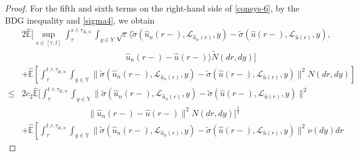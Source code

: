 \documentclass[11pt]{article}
\numberwithin{equation}{section}
\theoremstyle{plain}
\begin{document}
\begin{proof}
  For the fifth and sixth terms on the right-hand side of \eqref{consys-6},
  by the
  BDG inequality and \eqref{sigma4},
  we obtain
  \begin{align}\label{consys-10}
         & 2 \widehat{\mathbb{E}}
                 \bigg[ \sup_{s \in [\tau,t]}
                           \int_{\tau}^{s \wedge \tau_{K,n}} 
                               \int_{ {y \in Y} }
                                   \sqrt{\varepsilon}  
                                        \big\langle   
                                            \widetilde{\sigma}(\hat{u}_n(r-), \mathcal{L}_{\hat{u}_n(r)},y)
                                             - \widetilde{\sigma}(\hat{u}(r-), \mathcal{L}_{\hat{u}(r)},y),
                                                   \nonumber\\
          & \qquad\qquad\qquad\qquad\qquad\qquad\
                                              \hat{u}_n(r-) - \hat{u}(r-)
                                           \big\rangle \widetilde{N}(dr,dy)
                 \bigg]  \nonumber\\
          & + \widehat{\mathbb{E}}
                 \left[ \int_{\tau}^{t \wedge \tau_{K,n}} 
                              \int_{y \in \mathbb{Y} }
                                  \| \widetilde{\sigma}(\hat{u}_n(r-), \mathcal{L}_{\hat{u}_n(r)}, y)
                                     - \widetilde{\sigma}(\hat{u}(r-), \mathcal{L}_{\hat{u}(r)}, y)
                                  \|^2 N(dr,dy)
                 \right]  \nonumber\\
    \le & 2 c_2 \widehat{\mathbb{E}}
               \bigg[ \int_{\tau}^{t\wedge\tau_{K,n}}
                            \int_{y \in \mathbb{Y} }
                                \| \widetilde{\sigma}(\hat{u}_n(r-), \mathcal{L}_{\hat{u}_n(r)}, y)
                                    - \widetilde{\sigma}(\hat{u}(r-), \mathcal{L}_{\hat{u}(r)}, y)
                                \|^2 \nonumber\\
          & \qquad\qquad\qquad \ \ \ \ \ \ \ \
                     \| \hat{u}_n(r-) - \hat{u}(r-) \|^2 N(dr, dy)  
                \bigg]^{\frac{1}{2}}  \nonumber\\
          & + \widehat{\mathbb{E}}
                 \left[ \int_{\tau}^{t \wedge \tau_{K,n}} 
                              \int_{y \in \mathbb{Y} }
                                   \| \widetilde{\sigma}(\hat{u}_n(r-), \mathcal{L}_{\hat{u}_n(r)}, y)
                                       - \widetilde{\sigma}(\hat{u}(r-), \mathcal{L}_{\hat{u}(r)}, y)
                                   \|^2 \nu(dy) dr

\end{align}
\end{proof}
\end{document}
